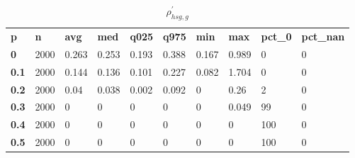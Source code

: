 \begin{table}[h]
 \centering 
\footnotesize
\caption{$\rho_{hsg,g}^\prime $}
\label{tab:alphahsgg}
\begin{tabular}[h]{| l l l l l l l l l l|
    } \hline
\textbf{ p} & \textbf{ n} & \textbf{ avg} & \textbf{ med} & \textbf{ q025} & \textbf{ q975} & \textbf{ min} & \textbf{ max} & \textbf{ pct\_0} & \textbf{ pct\_nan}
           \\
  \textbf{  0} & 2000 & 0.263 & 0.253 & 0.193 & 0.388 & 0.167 & 0.989 &   0 & 0
           \\
  \textbf{0.1} & 2000 & 0.144 & 0.136 & 0.101 & 0.227 & 0.082 & 1.704 &   0 & 0
           \\
  \textbf{0.2} & 2000 &  0.04 & 0.038 & 0.002 & 0.092 &     0 &  0.26 &   2 & 0
           \\
  \textbf{0.3} & 2000 &     0 &     0 &     0 &     0 &     0 & 0.049 &  99 & 0
           \\
  \textbf{0.4} & 2000 &     0 &     0 &     0 &     0 &     0 &     0 & 100 & 0
           \\
  \textbf{0.5} & 2000 &     0 &     0 &     0 &     0 &     0 &     0 & 100 & 0
           \\
 \hline \end{tabular}
 \end{table}
